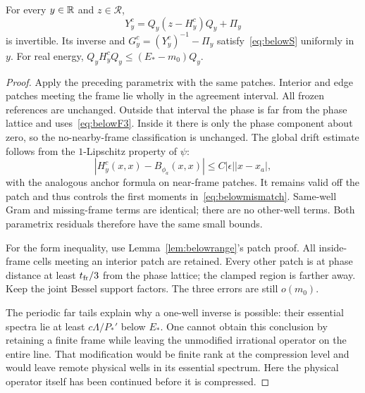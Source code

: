 \begin{lemma}\label{lem:Sc}
For every $y\in\mathbb R$ and $z\in\mathcal R$,
\[
 Y_y^c=Q_y(z-H_y^c)Q_y+\Pi_y
\]
is invertible. Its inverse and $G_y^c=(Y_y^c)^{-1}-\Pi_y$ satisfy~\eqref{eq:belowS} uniformly in $y$. For real energy,
$Q_yH_y^cQ_y\le(E_*-m_0)Q_y$.
\end{lemma}
\begin{proof}
Apply the preceding parametrix with the same patches. Interior and edge patches meeting the frame lie wholly in the agreement interval. All frozen references are unchanged. Outside that interval the phase is far from the phase lattice and uses~\eqref{eq:belowF3}. Inside it there is only the phase component about zero, so the no-nearby-frame classification is unchanged. The global drift estimate follows from the $1$-Lipschitz property of $\psi$:
\[
 |H_y^c(x,x)-B_{\phi_a}(x,x)|\le C|\epsilon||x-x_a|,
\]
with the analogous anchor formula on near-frame patches. It remains valid off the patch and thus controls the first moments in~\eqref{eq:belowmismatch}. Same-well Gram and missing-frame terms are identical; there are no other-well terms. Both parametrix residuals therefore have the same small bounds.

For the form inequality, use Lemma~\ref{lem:belowrange}'s patch proof. All inside-frame cells meeting an interior patch are retained. Every other patch is at phase distance at least $t_{\rm fr}/3$ from the phase lattice; the clamped region is farther away. Keep the joint Bessel support factors. The three errors are still $o(m_0)$.

The periodic far tails explain why a one-well inverse is possible: their essential spectra lie at least $c\Lambda/P_*'$ below $E_*$. One cannot obtain this conclusion by retaining a finite frame while leaving the unmodified irrational operator on the entire line. That modification would be finite rank at the compression level and would leave remote physical wells in its essential spectrum. Here the physical operator itself has been continued before it is compressed.
\end{proof}
\label{end:below-resolvent}
